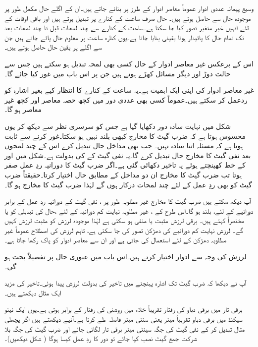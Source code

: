 وسیع پیمانہ عددی ادوار عموماً معاصر ادوار کے طرز پر بنائے جاتے ہیں۔ان کے اگلے حال مکمل طور پر موجودہ حال سے حاصل ہوتے ہیں۔ حال صرف ساعت کے کنارے پر تبدیل ہوتے ہیں اور باقی اوقات کے لئے انہیں غیر متغیر تصور کیا جا سکتا ہے۔ساعت کے کنارے سے چند لمحات قبل تا چند لمحات بعد تک تمام حال کا پائیدار ہونا یقینی بنایا جاتا ہے۔یوں کنارہ ساعت پر معلوم حال پائے جاتے ہیں جن سے اگلے پر یقین حال حاصل ہوتے ہیں۔ 

اس کے برعکس غیر معاصر ادوار کے حال کسی بھی لمحہ تبدیل ہو سکتے ہیں جس سے حالت دوڑ اور دیگر مسائل کھڑے ہوتے ہیں جن پر اس باب میں غور کیا جائے گا۔

غیر معاصر ادوار کی اپنی ایک اہمیت ہے۔یہ ساعت کے کنارے کا انتظار کیے بغیر اشارہ کو ردعمل کر سکتے ہیں۔عموماً کسی بھی عددی دور میں کچھ حصہ معاصر اور کچھ غیر معاصر ہو گا۔

شکل میں نہایت سادہ دور دکھایا گیا ہے جس کو سرسری نظر سے دیکھ کر یوں محسوس ہوتا ہے کہ ضرب گیٹ کا مخارج کبھی بلند نہیں ہو سکتا۔غور کرنے سے ثابت ہوتا ہے کہ مسئلہ اتنا سادہ نہیں۔ جب بھی مداخل  حال تبدیل کرے اس کے چند لمحوں بعد نفی گیٹ کا مخارج حال تبدیل کرے گا۔یہ  نفی گیٹ کے  کی بدولت ہے۔شکل میں  اور  کے خط کھینچتے ہوئے یہ تاخیر دکھائی گئی ہے۔اگر ضرب گیٹ کا دورانیہ ردِ عمل صفر ہوتا تب ضرب گیٹ کا مخارج ان دو مداخل کے مطابق حال  اختیار کرتا۔حقیقتاً ضرب گیٹ کو بھی ردِ عمل کے لئے چند لمحات درکار ہوں گے لہٰذا ضرب گیٹ کا مخارج  ہو گا۔

آپ دیکھ سکتے ہیں ضرب گیٹ کا مخارج غیر مطلوبہ طور پر ، نفی گیٹ کے دورانیہ ردِ عمل کے برابر دورانیے کے لئے، بلند ہو گا۔اس طرح کے ، غیر مطلوبہ نہایت کم دورانیہ کے لئے ،حال کی تبدیلی کو یا مختصراً  کہتے ہیں۔ برقی لرزش مثبت یا منفی ہو سکتی ہے لہٰذا موجودہ لرزش کو مثبت لرزش کہیں گے۔ لرزش نہایت کم دورانیے کی دھڑکن تصور کی جا سکتی ہے، تاہم لرزش کی اصطلاح عموماً غیر مطلوبہ دھڑکن کے لئے استعمال کی جاتی ہے اور ان سے معاصر ادوار کو پاک رکھا جاتا ہے۔

 لرزش کی وجہ سے ادوار   اختیار کرتے ہیں۔اس باب میں عبوری حال پر تفصیلاً بحث ہو گی۔ 

آپ نے دیکھا کہ ضرب گیٹ تک اشارہ  پہنچنے میں تاخیر کی بدولت لرزش پیدا ہوئی۔تاخیر کی مزید ایک مثال دیکھتے ہیں۔

برقی تار میں برقی دباو کی رفتار تقریباً خلاء میں روشنی کی رفتار کے برابر ہوتی ہے۔یوں ایک نینو سیکنڈ میں برقی دباو تقریباً  میٹر یعنی  سنٹی میٹر فاصلہ طے کرتا ہے۔آئیے دیکھتے ہیں اگر پچھلی مثال تبدیل کر کے نفی گیٹ کی جگہ  سینٹی میٹر برقی تار لگائی جائے اور ضرب گیٹ کی جگہ بلا شرکت جمع گیٹ نصب کیا جائے تو دور کا ردِ عمل کیسا ہوگا ( شکل دیکھیں)۔


